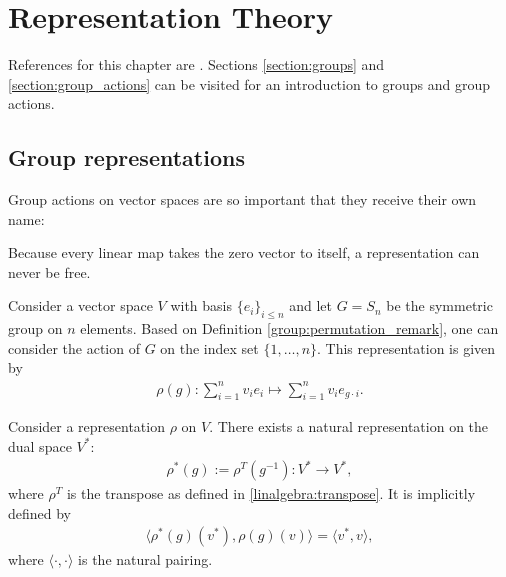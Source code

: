 \chapter{Representation Theory}

    References for this chapter are \cite{fultonharris, jeevanjee}. Sections \ref{section:groups} and \ref{section:group_actions} can be visited for an introduction to groups and group actions.

\section{Group representations}

    Group actions on vector spaces are so important that they receive their own name:
    \begin{property}
        Because every linear map takes the zero vector to itself, a representation can never be free.
    \end{property}


    \begin{example}\label{rep:permutation}
        Consider a vector space $V$ with basis $\{e_i\}_{i\leq n}$ and let $G=S_n$ be the symmetric group on $n$ elements. Based on Definition \ref{group:permutation_remark}, one can consider the action of $G$ on the index set $\{1,\ldots,n\}$. This representation is given by
        \begin{gather}
            \rho(g):\sum_{i=1}^nv_ie_i\mapsto\sum_{i=1}^nv_ie_{g\cdot i}.
        \end{gather}
    \end{example}

    \begin{example}
        Consider a representation $\rho$ on $V$. There exists a natural representation on the dual space $V^*$:
        \begin{gather}
            \rho^*(g) := \rho^T(g^{-1}): V^*\rightarrow V^*,
        \end{gather}
        where $\rho^T$ is the transpose as defined in \ref{linalgebra:transpose}. It is implicitly defined by
        \begin{gather}
            \Big\langle\rho^*(g)(v^*),\rho(g)(v)\Big\rangle = \langle v^*,v \rangle,
        \end{gather}
        where $\langle\cdot,\cdot\rangle$ is the natural pairing.
    \end{example}

